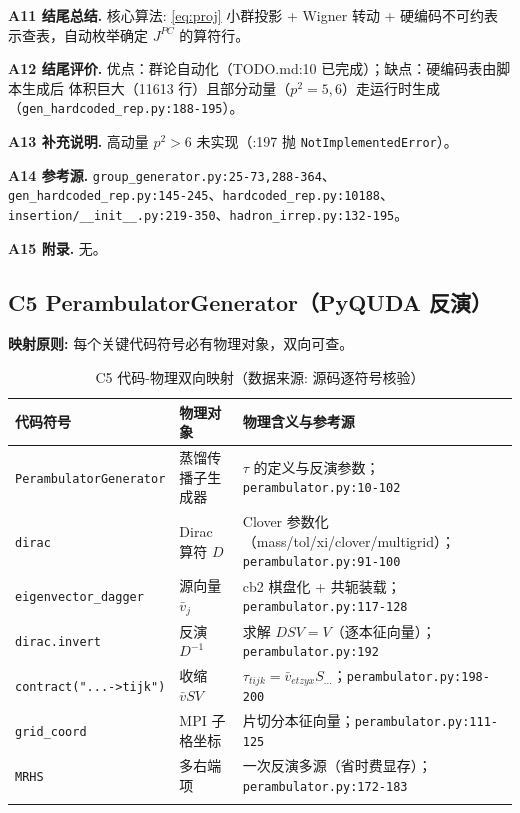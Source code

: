 \documentclass[UTF8]{ctexart}
\begin{document}
\textbf{A11 结尾总结.} \textcolor{algo}{核心算法:} \eqref{eq:proj} 小群投影 + Wigner 转动
+ 硬编码不可约表示查表，自动枚举确定 $J^{PC}$ 的算符行。

\textbf{A12 结尾评价.} 优点：群论自动化（TODO.md:10 已完成）；缺点：硬编码表由脚本生成后
体积巨大（11613 行）且部分动量（$p^2=5,6$）走运行时生成（\texttt{\nolinkurl{gen_hardcoded_rep.py:188-195}}）。

\textbf{A13 补充说明.} 高动量 $p^2>6$ 未实现（:197 抛 \texttt{NotImplementedError}）。

\textbf{A14 参考源.} \texttt{\nolinkurl{group_generator.py:25-73,288-364}}、
\texttt{\nolinkurl{gen_hardcoded_rep.py:145-245}}、\texttt{\nolinkurl{hardcoded_rep.py:10188}}、
\texttt{\nolinkurl{insertion/__init__.py:219-350}}、\texttt{\nolinkurl{hadron_irrep.py:132-195}}。

\textbf{A15 附录.} 无。

\subsection{C5 PerambulatorGenerator（PyQUDA 反演）}

\begin{mapbox}
\textbf{映射原则:} 每个关键代码符号必有物理对象，双向可查。
\end{mapbox}

{\footnotesize\begin{xltabular}{\textwidth}{XlX}
\toprule
\textcolor{map}{代码符号} & 物理对象 & 物理含义与参考源 \\
\midrule
\endhead
\texttt{PerambulatorGenerator} & 蒸馏传播子生成器 & $\tau$ 的定义与反演参数；\texttt{\nolinkurl{perambulator.py:10-102}} \\
\texttt{dirac} & Dirac 算符 $D$ & Clover 参数化（mass/tol/xi/clover/multigrid）；\texttt{\nolinkurl{perambulator.py:91-100}} \\
\texttt{\nolinkurl{eigenvector_dagger}} & 源向量 $\bar v_j$ & cb2 棋盘化 + 共轭装载；\texttt{\nolinkurl{perambulator.py:117-128}} \\
\texttt{\nolinkurl{dirac.invert}} & 反演 $D^{-1}$ & 求解 $D S V = V$（逐本征向量）；\texttt{\nolinkurl{perambulator.py:192}} \\
\texttt{contract("...->tijk")} & 收缩 $\bar v SV$ & $\tau_{tijk}=\bar v_{etzyx} S_{...}$；\texttt{\nolinkurl{perambulator.py:198-200}} \\
\texttt{\nolinkurl{grid_coord}} & MPI 子格坐标 & 片切分本征向量；\texttt{\nolinkurl{perambulator.py:111-125}} \\
\texttt{MRHS} & 多右端项 & 一次反演多源（省时费显存）；\texttt{\nolinkurl{perambulator.py:172-183}} \\
\bottomrule
\caption{C5 代码-物理双向映射（数据来源: 源码逐符号核验）}
\end{xltabular}}
\end{document}
